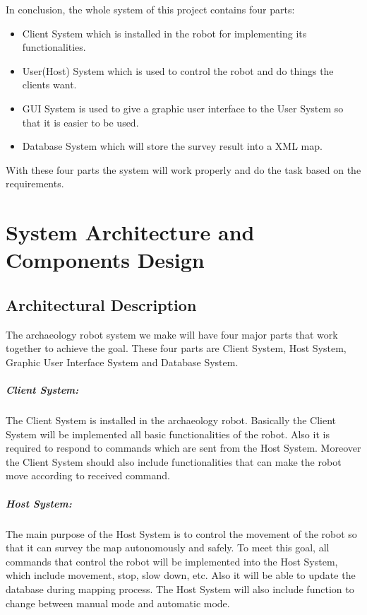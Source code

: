 \documentclass[11pt, a4paper]{report}
\begin{document}
In conclusion, the whole system of this project contains four parts:
\begin{itemize}
  \item Client System which is installed in the robot for implementing its functionalities.
  \item User(Host) System which is used to control the robot and do things the clients want.
  \item GUI System is used to give a graphic user interface to the User System so that it is easier to be used.
  \item Database System which will store the survey result into a XML map.
\end{itemize}
With these four parts the system will work properly and do the task based on the requirements.



\pagebreak


\chapter{System Architecture and Components Design}%
\label{cha:SACD}


\section{Architectural Description}
The archaeology robot system we make will have four major parts that work together to achieve the goal. 
These four parts are Client System, Host System, Graphic User Interface System and Database System.
\paragraph{Client System: }The Client System is installed in the archaeology robot. 
Basically the Client System will be implemented all basic functionalities of the robot. 
Also it is required to respond to commands which are sent from the Host System. 
Moreover the Client System should also include functionalities that can make the robot move 
according to received command.

\paragraph{Host System: }The main purpose of the Host System is to control the movement of the robot 
so that it can survey the map autonomously and safely. 
To meet this goal, all commands that control the robot will be implemented into the Host System, 
which include movement, stop, slow down, etc. Also it will be able to update the database during mapping
process.  The Host System will also include function to change between manual mode and automatic
mode.
\newline
\end{document}
